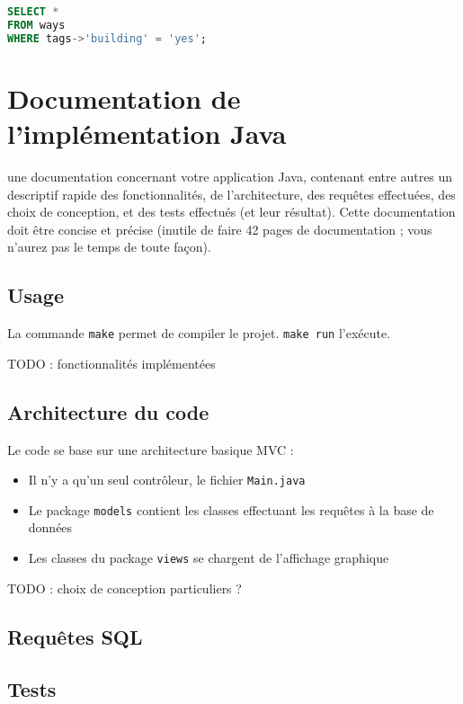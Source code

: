 \documentclass[12pt]{article}
\begin{document}
\begin{lstlisting}[language=SQL]
SELECT *
FROM ways
WHERE tags->'building' = 'yes';
\end{lstlisting}

\newpage

\section*{Documentation de l'implémentation Java}

une documentation concernant votre application Java, contenant entre autres un descriptif rapide des fonctionnalités, de l'architecture, des requêtes effectuées, des choix de conception, et des tests effectués (et leur résultat). Cette documentation doit être concise et précise (inutile de faire 42 pages de documentation ; vous n'aurez pas le temps de toute façon).

\subsection*{Usage}

La commande \verb?make? permet de compiler le projet. \verb?make run? l'exécute.

TODO : fonctionnalités implémentées

\subsection*{Architecture du code}

Le code se base sur une architecture basique MVC :

\begin{itemize}
\item Il n'y a qu'un seul contrôleur, le fichier \verb?Main.java?
\item Le package \verb?models? contient les classes effectuant les requêtes à la
base de données
\item Les classes du package \verb?views? se chargent de l'affichage graphique
\end{itemize}

TODO : choix de conception particuliers ?

\subsection*{Requêtes SQL}



\subsection*{Tests}
\end{document}
